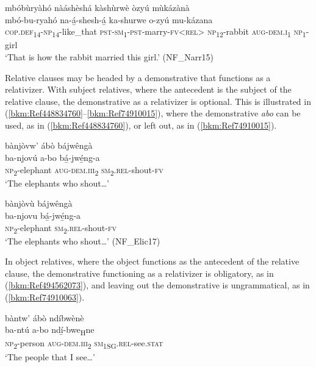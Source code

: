 \ea
\label{bkm:Ref490752278}
mbóbùryàhó nàáshèshá kàshùrwè òzyú mùkázànà\\
\gll mbó-bu-ryahó    na-á̲-shesh-á̲        ka-shurwe o-zyú    mu-kázana \\
\textsc{cop}.\textsc{def}\textsubscript{14}-\textsc{np}\textsubscript{14}-like\_that  \textsc{pst}-\textsc{sm}\textsubscript{1}-\textsc{pst}-marry-\textsc{fv}<\textsc{rel}>  \textsc{np}\textsubscript{12}-rabbit
\textsc{aug}-\textsc{dem}.\textsc{i}\textsubscript{1}  \textsc{np}\textsubscript{1}-girl\\
\glt ‘That is how the rabbit married this girl.’ (NF\_Narr15)
\z

Relative clauses may be headed by a demonstrative that functions as a relativizer. With subject relatives, where the antecedent is the subject of the relative clause, the demonstrative as a relativizer is optional. This is illustrated in (\ref{bkm:Ref448834760}--\ref{bkm:Ref74910015}), where the demonstrative \textit{abo} can be used, as in (\ref{bkm:Ref448834760}), or left out, as in (\ref{bkm:Ref74910015}).

\ea
\label{bkm:Ref448834760}
bànjòvw’ ábò bájwêngà\\
\gll ba-njovú  a-bo    bá̲-jwé̲ng-a\\
\textsc{np}\textsubscript{2}-elephant  \textsc{aug}-\textsc{dem}.\textsc{iii}\textsubscript{2}  \textsc{sm}\textsubscript{2}.\textsc{rel}-shout-\textsc{fv}\\
\glt ‘The elephants who shout…’
\z

\ea
\label{bkm:Ref74910015}
bànjòvù bájwêngà\\
\gll ba-njovu    bá̲-jwé̲ng-a\\
\textsc{np}\textsubscript{2}-elephant    \textsc{sm}\textsubscript{2}.\textsc{rel}-shout-\textsc{fv}\\
\glt ‘The elephants who shout…’ (NF\_Elic17)
\z

In object relatives, where the object functions as the antecedent of the relative clause, the demonstrative functioning as a relativizer is obligatory, as in (\ref{bkm:Ref494562073}), and leaving out the demonstrative is ungrammatical, as in (\ref{bkm:Ref74910063}).

\ea
\label{bkm:Ref494562073}
bàntw’ ábò ndíbwènè\\
\gll ba-ntú  a-bo    ndí̲-bwe\textsubscript{H}ne\\
\textsc{np}\textsubscript{2}-person  \textsc{aug}-\textsc{dem}.\textsc{iii}\textsubscript{2} \textsc{sm}\textsubscript{1SG}.\textsc{rel}-see.\textsc{stat}\\
\glt ‘The people that I see…’
\z


